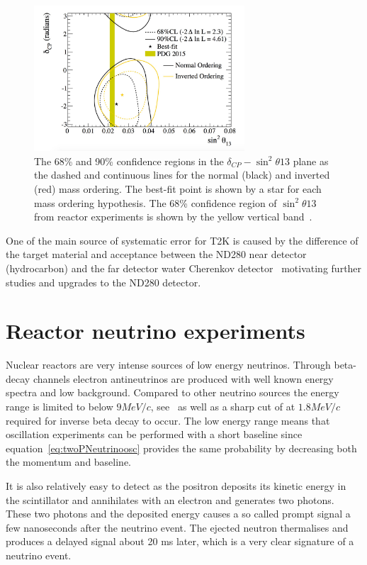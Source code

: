 \begin{figure}[h!]
\centering
  \centering
\includegraphics[width=0.7\textwidth]{figures/t2kfix.jpeg}
\vspace{2mm}
\caption{The 68\% and 90\% confidence regions in the $\delta_{CP} - \sin^2 \theta{13}$ plane as the dashed and continuous lines for the normal (black) and inverted (red) mass ordering. The best-fit point is shown by a star for each mass ordering hypothesis. The 68\% confidence region of $\sin^2 \theta{13}$ from reactor experiments is shown by the yellow vertical band~\cite{108Abe}.}
\label{fig:T2K12}
\end{figure}

One of the main source of systematic error for T2K is caused by the difference of the target material and acceptance between the ND280 near detector (hydrocarbon) and the far detector water Cherenkov detector~\cite{T2Kpaper} motivating further studies and upgrades to the ND280 detector.

\pagebreak
\newpage
\FloatBarrier
\section{Reactor neutrino experiments}
Nuclear reactors are very intense sources of low energy neutrinos. Through beta-decay channels electron antineutrinos are produced with well known energy spectra and low background. Compared to other neutrino sources the energy range is limited to below $9 MeV/c$, see~ as well as a sharp cut of at $1.8 MeV/c$ required for inverse beta decay to occur. The low energy range means that oscillation experiments can be performed with a short baseline since equation~\ref{eq:twoPNeutrinoosc} provides the same probability by decreasing both the momentum and baseline.

It is also relatively easy to detect as the positron deposits its kinetic energy in the scintillator and annihilates with an electron and generates two photons. These two photons and the deposited energy causes a so called prompt signal a few nanoseconds after the neutrino event. The ejected neutron thermalises and produces a delayed signal about 20 ms later, which is a very clear signature of a neutrino event. 

